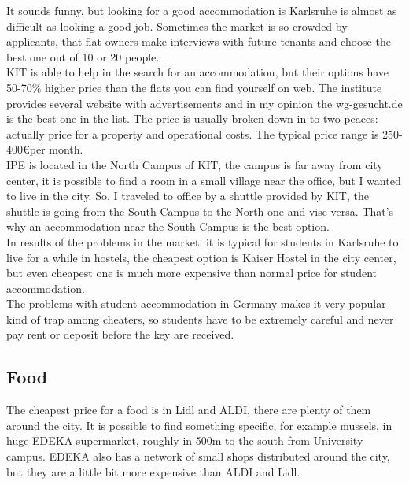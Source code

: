 \documentclass[english]{article}
\begin{document}
It sounds funny, but looking for a good accommodation is Karlsruhe is almost as difficult as looking a good job. Sometimes the market is so crowded by applicants, that flat owners make interviews with future tenants and choose the best one out of 10 or 20 people.\\

KIT is able to help in the search for an accommodation, but their options have 50-70\% higher price than the flats you can find yourself on web. The institute provides several website with advertisements and in my opinion the wg-gesucht.de is the best one in the list. The price is usually broken down in to two peaces: actually price for a property and operational costs. The typical price range is 250-400\euro per month.\\ 

IPE is located in the North Campus of KIT, the campus is far away from city center, it is possible to find a room in a small village near the office, but I wanted to live in the city. So, I traveled to office by a shuttle provided by KIT, the shuttle is going from the South Campus to the North one and vise versa. That's why an accommodation near the South Campus is the best option.\\

In results of the problems in the market, it is typical for students in Karlsruhe to live for a while in hostels, the cheapest option is Kaiser Hostel in the city center, but even cheapest one is much more expensive than normal price for student accommodation. \\

The problems with student accommodation in Germany makes it very popular kind of trap among cheaters, so students have to be extremely careful and never pay rent or deposit before the key are received.\\

\subsection{Food}

The cheapest price for a food is in Lidl and ALDI, there are plenty of them around the city. It is possible to find something specific, for example mussels, in huge EDEKA supermarket, roughly in 500m to the south from University campus. EDEKA also has a network of small shops distributed around the city, but they are a little bit more expensive than ALDI and Lidl.\\
\end{document}
